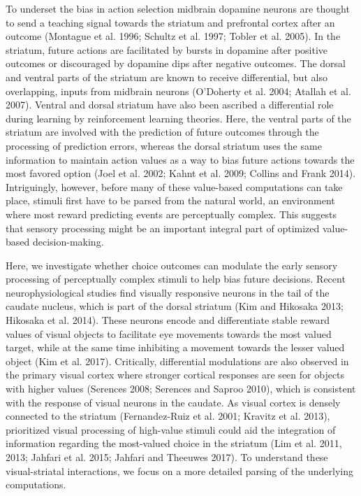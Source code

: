 \documentclass[]{article}
\begin{document}
To underset the bias in action selection midbrain dopamine neurons are
thought to send a teaching signal towards the striatum and prefrontal
cortex after an outcome (Montague et al. 1996; Schultz et al. 1997;
Tobler et al. 2005). In the striatum, future actions are facilitated by
bursts in dopamine after positive outcomes or discouraged by dopamine
dips after negative outcomes. The dorsal and ventral parts of the
striatum are known to receive differential, but also overlapping, inputs
from midbrain neurons (O'Doherty et al. 2004; Atallah et al. 2007).
Ventral and dorsal striatum have also been ascribed a differential role
during learning by reinforcement learning theories. Here, the ventral
parts of the striatum are involved with the prediction of future
outcomes through the processing of prediction errors, whereas the dorsal
striatum uses the same information to maintain action values as a way to
bias future actions towards the most favored option (Joel et al. 2002;
Kahnt et al. 2009; Collins and Frank 2014). Intriguingly, however,
before many of these value-based computations can take place, stimuli
first have to be parsed from the natural world, an environment where
most reward predicting events are perceptually complex. This suggests
that sensory processing might be an important integral part of optimized
value-based decision-making.

Here, we investigate whether choice outcomes can modulate the early
sensory processing of perceptually complex stimuli to help bias future
decisions. Recent neurophysiological studies find visually responsive
neurons in the tail of the caudate nucleus, which is part of the dorsal
striatum (Kim and Hikosaka 2013; Hikosaka et al. 2014). These neurons
encode and differentiate stable reward values of visual objects to
facilitate eye movements towards the most valued target, while at the
same time inhibiting a movement towards the lesser valued object (Kim et
al. 2017). Critically, differential modulations are also observed in the
primary visual cortex where stronger cortical responses are seen for
objects with higher values (Serences 2008; Serences and Saproo 2010),
which is consistent with the response of visual neurons in the caudate.
As visual cortex is densely connected to the striatum (Fernandez-Ruiz et
al. 2001; Kravitz et al. 2013), prioritized visual processing of
high-value stimuli could aid the integration of information regarding
the most-valued choice in the striatum (Lim et al. 2011, 2013; Jahfari
et al. 2015; Jahfari and Theeuwes 2017). To understand these
visual-striatal interactions, we focus on a more detailed parsing of the
underlying computations.
\end{document}
